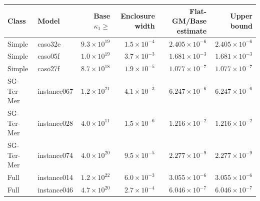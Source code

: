 \begin{tabular}{llrrrr}
\toprule
Class & Model & Base $\kappa_1\ge$ & Enclosure width & Flat-GM/Base estimate & Upper bound \\
\midrule
Simple & caso32e & $9.3\times10^{19}$ & $1.5\times10^{-4}$ & $2.405\times10^{-6}$ & $2.405\times10^{-6}$ \\
Simple & caso05f & $1.0\times10^{19}$ & $3.7\times10^{-3}$ & $1.681\times10^{-3}$ & $1.681\times10^{-3}$ \\
Simple & caso27f & $8.7\times10^{18}$ & $1.9\times10^{-5}$ & $1.077\times10^{-7}$ & $1.077\times10^{-7}$ \\
SG-Ter-Mer & instance067 & $1.2\times10^{21}$ & $4.1\times10^{-3}$ & $6.247\times10^{-6}$ & $6.247\times10^{-6}$ \\
SG-Ter-Mer & instance028 & $4.0\times10^{11}$ & $1.5\times10^{-6}$ & $1.216\times10^{-2}$ & $1.216\times10^{-2}$ \\
SG-Ter-Mer & instance074 & $4.0\times10^{20}$ & $9.5\times10^{-5}$ & $2.277\times10^{-9}$ & $2.277\times10^{-9}$ \\
Full & instance014 & $1.2\times10^{22}$ & $6.0\times10^{-3}$ & $3.055\times10^{-6}$ & $3.055\times10^{-6}$ \\
Full & instance046 & $4.7\times10^{20}$ & $2.7\times10^{-4}$ & $6.046\times10^{-7}$ & $6.046\times10^{-7}$ \\
\bottomrule
\end{tabular}
